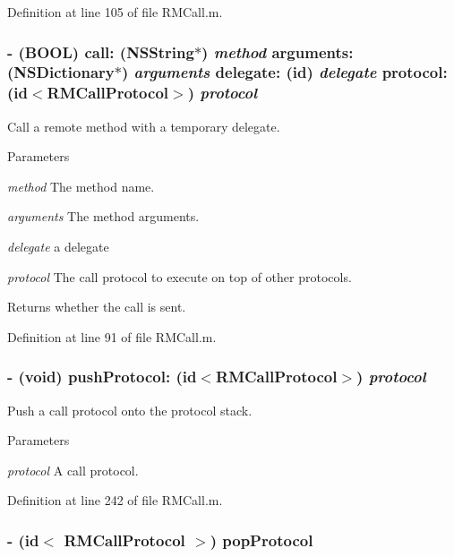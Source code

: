Definition at line 105 of file RMCall.m.\hypertarget{interface_r_m_call_aa01a7d4b9ff68f7cc187d52fba7b19b2}{
\subsubsection[{call:arguments:delegate:protocol:}]{\setlength{\rightskip}{0pt plus 5cm}-\/ (BOOL) call: (NSString$\ast$) {\em method}\/ arguments: (NSDictionary$\ast$) {\em arguments}\/ delegate: (id) {\em delegate}\/ protocol: (id$<${\bf RMCallProtocol}$>$) {\em protocol}}}
\label{interface_r_m_call_aa01a7d4b9ff68f7cc187d52fba7b19b2}


Call a remote method with a temporary delegate. 
\begin{DoxyParams}{Parameters}
\item[{\em method}]The method name. \item[{\em arguments}]The method arguments. \item[{\em delegate}]a delegate \item[{\em protocol}]The call protocol to execute on top of other protocols.\end{DoxyParams}
\begin{DoxyReturn}{Returns}
whether the call is sent. 
\end{DoxyReturn}


Definition at line 91 of file RMCall.m.\hypertarget{interface_r_m_call_afb23a22f89df78e62f45f2af2dd41623}{
\subsubsection[{pushProtocol:}]{\setlength{\rightskip}{0pt plus 5cm}-\/ (void) pushProtocol: (id$<${\bf RMCallProtocol}$>$) {\em protocol}}}
\label{interface_r_m_call_afb23a22f89df78e62f45f2af2dd41623}


Push a call protocol onto the protocol stack. 
\begin{DoxyParams}{Parameters}
\item[{\em protocol}]A call protocol. \end{DoxyParams}


Definition at line 242 of file RMCall.m.\hypertarget{interface_r_m_call_a2f55cbd7d34e98e4dbc74e1d8d8facf8}{
\subsubsection[{popProtocol}]{\setlength{\rightskip}{0pt plus 5cm}-\/ (id$<$ {\bf RMCallProtocol} $>$) popProtocol }}
\label{interface_r_m_call_a2f55cbd7d34e98e4dbc74e1d8d8facf8}


